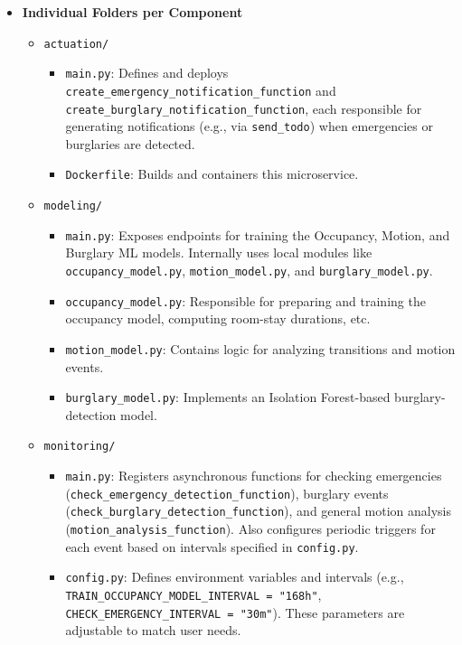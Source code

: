 \documentclass[A4,10pt]{article}
\begin{document}
\begin{itemize}
  \item \textbf{Individual Folders per Component}
  \begin{itemize}
    \item \texttt{actuation/}
      \begin{itemize}
        \item \texttt{main.py}: Defines and deploys \texttt{create\_emergency\_notification\_function}
          and \texttt{create\_burglary\_notification\_function}, each responsible for generating 
          notifications (e.g., via \texttt{send\_todo}) when emergencies or burglaries are detected.
        \item \texttt{Dockerfile}: Builds and containers this microservice.
      \end{itemize}

    \item \texttt{modeling/}
      \begin{itemize}
        \item \texttt{main.py}: Exposes endpoints for training the Occupancy, Motion, 
          and Burglary ML models. Internally uses local modules like \texttt{occupancy\_model.py},
          \texttt{motion\_model.py}, and \texttt{burglary\_model.py}.
        \item \texttt{occupancy\_model.py}: Responsible for preparing and training the occupancy model, 
          computing room-stay durations, etc.
        \item \texttt{motion\_model.py}: Contains logic for analyzing transitions and motion events. 
        \item \texttt{burglary\_model.py}: Implements an Isolation Forest-based burglary-detection model.
      \end{itemize}

    \item \texttt{monitoring/}
      \begin{itemize}
        \item \texttt{main.py}: Registers asynchronous functions for checking emergencies 
          (\texttt{check\_emergency\_detection\_function}), burglary events 
          (\texttt{check\_burglary\_detection\_function}), and general motion analysis 
          (\texttt{motion\_analysis\_function}). Also configures periodic triggers for each event 
          based on intervals specified in \texttt{config.py}.
        \item \texttt{config.py}: Defines environment variables and intervals 
          (e.g., \texttt{TRAIN\_OCCUPANCY\_MODEL\_INTERVAL = "168h"}, 
          \texttt{CHECK\_EMERGENCY\_INTERVAL = "30m"}). These parameters are adjustable 
          to match user needs.
      \end{itemize}
  \end{itemize}


\end{itemize}
\end{document}
